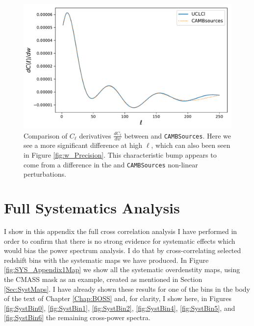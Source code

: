 \begin{figure}
\begin{center}
\includegraphics[scale=0.60]{BOSS-FIGS/PrecDw.pdf}
\caption[Comparison of $C_{\ell}$ derivatives $\frac{d C_{\ell}}{dw}$ between \uclcl and \texttt{CAMBSources}.]{Comparison of $C_{\ell}$ derivatives $\frac{d C_{\ell}}{dw}$ between \uclcl and \texttt{CAMBSources}. Here we see a more significant difference at high $\ell$, which can also been seen in Figure \ref{fig:w_Precision}. This characteristic bump appears to come from a difference in the \class and \texttt{CAMBSources} non-linear perturbations.}
\label{fig:Diff_w}
\end{center}
\end{figure}



\section{Full Systematics Analysis}\label{Apx:Systematics}
I show in this appendix the full cross correlation analysis I have performed in order to confirm that there is no strong evidence for systematic effects which would bias the power spectrum analysis. I do that by cross-correlating selected redshift bins with the systematic maps we have produced. In Figure \ref{fig:SYS_Appendix1Map} we show all the systematic overdenstity maps, using the CMASS mask as an example, created as mentioned in Section \ref{Sec:SystMaps}. I have already shown these results for one of the bins in the body of the text of Chapter \ref{Chap:BOSS} and, for clarity, I show here, in Figures \ref{fig:SystBin0}, \ref{fig:SystBin1}, \ref{fig:SystBin2}, \ref{fig:SystBin4}, \ref{fig:SystBin5}, and \ref{fig:SystBin6} the remaining cross-power spectra.

